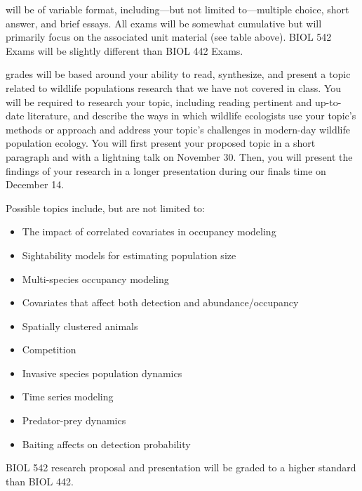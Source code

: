 \documentclass{tufte-handout}
\begin{document}
 will be of variable format, including---but not limited to---multiple choice, short answer, and brief essays. All exams will be somewhat cumulative but will primarily focus on the associated unit material (see table above). BIOL 542 Exams will be slightly different than BIOL 442 Exams. 

\begin{fullwidth}

 grades will be based around your ability to read, synthesize, and present a topic related to wildlife populations research that we have not covered in class. You will be required to research your topic, including reading pertinent and up-to-date literature, and describe the ways in which wildlife ecologists use your topic's methods or approach and address your topic's challenges in modern-day wildlife population ecology. You will first present your proposed topic in a short paragraph and with a lightning talk on November 30. Then, you will present the findings of your research in a longer presentation during our finals time on December 14. 

Possible topics include, but are not limited to: 


\begin{itemize}
\item The impact of correlated covariates in occupancy modeling
\item Sightability models for estimating population size
\item Multi-species occupancy modeling
\item Covariates that affect both detection and abundance/occupancy
\item Spatially clustered animals
\item Competition 
\item Invasive species population dynamics
\item Time series modeling
\item Predator-prey dynamics
\item Baiting affects on detection probability
\end{itemize}

BIOL 542 research proposal and presentation will be graded to a higher standard than BIOL 442. 






\end{fullwidth}
\end{document}
